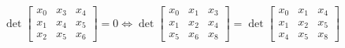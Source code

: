 $$ \det \left[\begin{matrix}x_{0} & x_{3} & x_{4}\\x_{1} & x_{4} & x_{5}\\x_{2} & x_{5} & x_{6}\end{matrix}\right] = 0 \Leftrightarrow \det \left[\begin{matrix}x_{0} & x_{1} & x_{3}\\x_{1} & x_{2} & x_{4}\\x_{5} & x_{6} & x_{8}\end{matrix}\right] = \det \left[\begin{matrix}x_{0} & x_{1} & x_{4}\\x_{1} & x_{2} & x_{5}\\x_{4} & x_{5} & x_{8}\end{matrix}\right] $$
